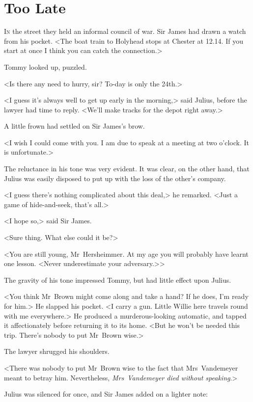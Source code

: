 \chapter{Too Late} 

 \lettrine{I}{n} the street they held an informal council of war. Sir James had drawn a watch from his pocket. <The boat train to Holyhead stops at Chester at 12.14. If you start at once I think you can catch the connection.>

Tommy looked up, puzzled.

<Is there any need to hurry, sir? To-day is only the 24th.>

<I guess it's always well to get up early in the morning,> said Julius, before the lawyer had time to reply. <We'll make tracks for the depot right away.>

A little frown had settled on Sir James's brow.

<I wish I could come with you. I am due to speak at a meeting at two o'clock. It is unfortunate.>

The reluctance in his tone was very evident. It was clear, on the other hand, that Julius was easily disposed to put up with the loss of the other's company.

<I guess there's nothing complicated about this deal,> he remarked. <Just a game of hide-and-seek, that's all.>

<I hope so,> said Sir James.

<Sure thing. What else could it be?>

<You are still young, Mr~Hersheimmer. At my age you will probably have learnt one lesson. <Never underestimate your adversary.>>

The gravity of his tone impressed Tommy, but had little effect upon Julius.

<You think Mr~Brown might come along and take a hand? If he does, I'm ready for him.> He slapped his pocket. <I carry a gun. Little Willie here travels round with me everywhere.> He produced a murderous-looking automatic, and tapped it affectionately before returning it to its home. <But he won't be needed this trip. There's nobody to put Mr~Brown wise.>

The lawyer shrugged his shoulders.

<There was nobody to put Mr~Brown wise to the fact that Mrs~Vandemeyer meant to betray him. Nevertheless, \emph{Mrs~Vandemeyer died without speaking}.>

Julius was silenced for once, and Sir James added on a lighter note:

